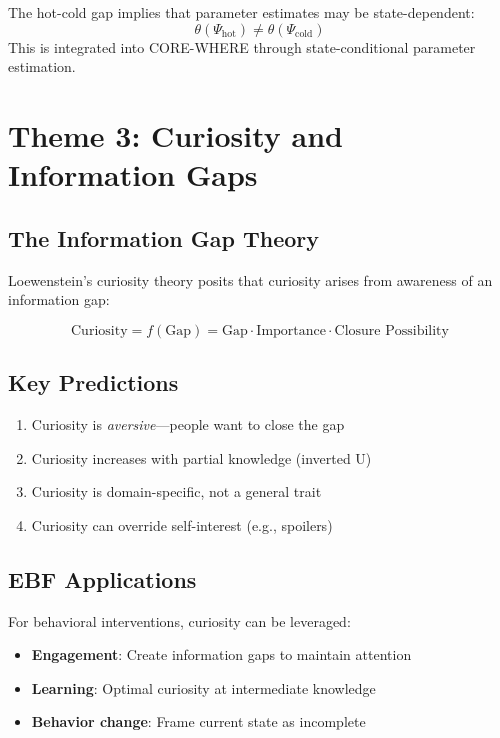 The hot-cold gap implies that parameter estimates may be state-dependent:
\begin{equation}
\theta(\Psi_{\text{hot}}) \neq \theta(\Psi_{\text{cold}})
\end{equation}
This is integrated into CORE-WHERE through state-conditional parameter estimation.


\section{Theme 3: Curiosity and Information Gaps}
\label{sec:lo-curiosity}

\subsection{The Information Gap Theory}

Loewenstein's curiosity theory \citep{loewenstein1999curiosity} posits that curiosity arises from awareness of an information gap:

\begin{equation}
\text{Curiosity} = f(\text{Gap}) = \text{Gap} \cdot \text{Importance} \cdot \text{Closure Possibility}
\end{equation}

\subsection{Key Predictions}

\begin{enumerate}[nosep]
\item Curiosity is \textit{aversive}---people want to close the gap
\item Curiosity increases with partial knowledge (inverted U)
\item Curiosity is domain-specific, not a general trait
\item Curiosity can override self-interest (e.g., spoilers)
\end{enumerate}

\subsection{EBF Applications}

For behavioral interventions, curiosity can be leveraged:
\begin{itemize}[nosep]
\item \textbf{Engagement}: Create information gaps to maintain attention
\item \textbf{Learning}: Optimal curiosity at intermediate knowledge
\item \textbf{Behavior change}: Frame current state as incomplete
\end{itemize}


